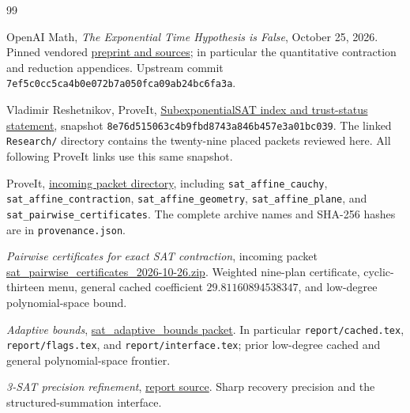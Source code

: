 \begin{thebibliography}{99}
\raggedright
{}

OpenAI Math, \emph{The Exponential Time Hypothesis is False},
October 25, 2026. Pinned vendored
\href{https://github.com/VladimirReshetnikov/ProveIt/tree/8e76d515063c4b9fbd8743a846b457e3a01bc039/lib/openai-math/preprints/The-Exponential-Time-Hypothesis-is-False-October-25-2026}{preprint and sources};
in particular the quantitative contraction and reduction appendices.
Upstream commit \texttt{7ef5c0cc5ca4b0e072b7a050fca09ab24bc6fa3a}.

Vladimir Reshetnikov, ProveIt,
\href{https://github.com/VladimirReshetnikov/ProveIt/blob/8e76d515063c4b9fbd8743a846b457e3a01bc039/Computability/SubexponentialSAT/README.md}{SubexponentialSAT index and trust-status statement},
snapshot \texttt{8e76d515063c4b9fbd8743a846b457e3a01bc039}.
The linked \texttt{Research/} directory contains the twenty-nine placed
packets reviewed here. All following ProveIt links use this same snapshot.

ProveIt, \href{https://github.com/VladimirReshetnikov/ProveIt/tree/8e76d515063c4b9fbd8743a846b457e3a01bc039/docs/incoming}{incoming packet directory},
including \texttt{sat\_affine\_cauchy},
\texttt{sat\_affine\_contraction}, \texttt{sat\_affine\_geometry},
\texttt{sat\_affine\_plane}, and \texttt{sat\_pairwise\_certificates}.
The complete archive names and SHA-256 hashes are in
\texttt{provenance.json}.

\emph{Pairwise certificates for exact SAT contraction}, incoming packet
\href{https://github.com/VladimirReshetnikov/ProveIt/blob/8e76d515063c4b9fbd8743a846b457e3a01bc039/docs/incoming/sat_pairwise_certificates_2026-10-26.zip}{sat\_pairwise\_certificates\_2026-10-26.zip}.
Weighted nine-plan certificate, cyclic-thirteen menu, general cached
coefficient $29.81160894538347$, and low-degree polynomial-space bound.

\emph{Adaptive bounds},
\href{https://github.com/VladimirReshetnikov/ProveIt/tree/8e76d515063c4b9fbd8743a846b457e3a01bc039/Computability/SubexponentialSAT/Research/sat_adaptive_bounds}{sat\_adaptive\_bounds packet}.
In particular \texttt{report/cached.tex}, \texttt{report/flags.tex},
and \texttt{report/interface.tex}; prior low-degree cached and general
polynomial-space frontier.

\emph{3-SAT precision refinement},
\href{https://github.com/VladimirReshetnikov/ProveIt/blob/8e76d515063c4b9fbd8743a846b457e3a01bc039/Computability/SubexponentialSAT/Research/3sat_precision_refinement/report.tex}{report source}.
Sharp recovery precision and the structured-summation interface.


\end{thebibliography}
